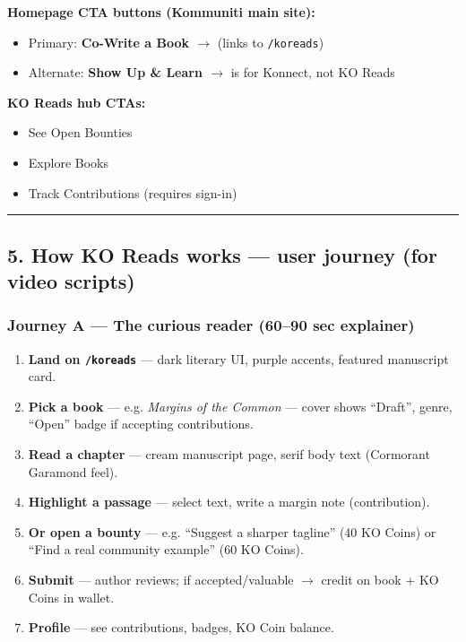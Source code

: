 \documentclass[11pt,a4paper]{report}
\begin{document}
\textbf{Homepage CTA buttons (Kommuniti main site):}

\begin{itemize}
  \item Primary: \textbf{Co-Write a Book $\rightarrow$} (links to \texttt{/koreads})
  \item Alternate: \textbf{Show Up \& Learn $\rightarrow$} is for Konnect, not KO Reads
\end{itemize}

\textbf{KO Reads hub CTAs:}

\begin{itemize}
  \item See Open Bounties
  \item Explore Books
  \item Track Contributions (requires sign-in)
\end{itemize}

\medskip\hrule\medskip

\subsection{5. How KO Reads works --- user journey (for video scripts)}

\subsubsection{Journey A --- The curious reader (60--90 sec explainer)}

\begin{enumerate}
  \item \textbf{Land on \texttt{/koreads}} --- dark literary UI, purple accents, featured manuscript card.
  \item \textbf{Pick a book} --- e.g. \textit{Margins of the Common} --- cover shows “Draft”, genre, “Open” badge if accepting contributions.
  \item \textbf{Read a chapter} --- cream manuscript page, serif body text (Cormorant Garamond feel).
  \item \textbf{Highlight a passage} --- select text, write a margin note (contribution).
  \item \textbf{Or open a bounty} --- e.g. “Suggest a sharper tagline” (40 KO Coins) or “Find a real community example” (60 KO Coins).
  \item \textbf{Submit} --- author reviews; if accepted/valuable $\rightarrow$ credit on book + KO Coins in wallet.
  \item \textbf{Profile} --- see contributions, badges, KO Coin balance.
\end{enumerate}
\end{document}
